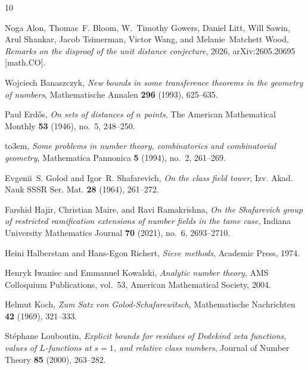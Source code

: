 \providecommand{\bysame}{\leavevmode\hbox to3em{\hrulefill}\thinspace}
\providecommand{\MR}{\relax\ifhmode\unskip\space\fi MR }
\providecommand{\MRhref}[2]{%
  \href{http://www.ams.org/mathscinet-getitem?mr=#1}{#2}
}
\providecommand{\href}[2]{#2}
\begin{thebibliography}{10}

Noga Alon, Thomas~F. Bloom, W.~Timothy Gowers, Daniel Litt, Will Sawin, Arul
  Shankar, Jacob Tsimerman, Victor Wang, and Melanie~Matchett Wood,
  \emph{Remarks on the disproof of the unit distance conjecture}, 2026,
  arXiv:2605.20695 [math.CO].

Wojciech Banaszczyk, \emph{New bounds in some transference theorems in the
  geometry of numbers}, Mathematische Annalen \textbf{296} (1993), 625--635.

Paul Erd{\H o}s, \emph{On sets of distances of {$n$} points}, The American
  Mathematical Monthly \textbf{53} (1946), no.~5, 248--250.

\bysame, \emph{Some problems in number theory, combinatorics and combinatorial
  geometry}, Mathematica Pannonica \textbf{5} (1994), no.~2, 261--269.

Evgenii~S. Golod and Igor~R. Shafarevich, \emph{On the class field tower}, Izv.
  Akad. Nauk SSSR Ser. Mat. \textbf{28} (1964), 261--272.

Farshid Hajir, Christian Maire, and Ravi Ramakrishna, \emph{On the
  {Shafarevich} group of restricted ramification extensions of number fields in
  the tame case}, Indiana University Mathematics Journal \textbf{70} (2021),
  no.~6, 2693--2710.

Heini Halberstam and Hans-Egon Richert, \emph{Sieve methods}, Academic Press,
  1974.

Henryk Iwaniec and Emmanuel Kowalski, \emph{Analytic number theory}, AMS
  Colloquium Publications, vol.~53, American Mathematical Society, 2004.

Helmut Koch, \emph{Zum {Satz} von {Golod-Schafarewitsch}}, Mathematische
  Nachrichten \textbf{42} (1969), 321--333.

St{\'e}phane Louboutin, \emph{Explicit bounds for residues of {Dedekind} zeta
  functions, values of {$L$}-functions at {$s=1$}, and relative class numbers},
  Journal of Number Theory \textbf{85} (2000), 263--282.


\end{thebibliography}
